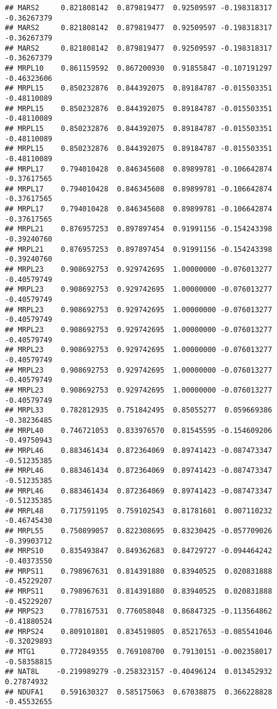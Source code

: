 \documentclass[
]{article}
\begin{document}
\begin{verbatim}
## MARS2     0.821808142  0.879819477  0.92509597 -0.198318317 -0.36267379
## MARS2     0.821808142  0.879819477  0.92509597 -0.198318317 -0.36267379
## MARS2     0.821808142  0.879819477  0.92509597 -0.198318317 -0.36267379
## MRPL10    0.861159592  0.867200930  0.91855847 -0.107191297 -0.46323606
## MRPL15    0.850232876  0.844392075  0.89184787 -0.015503351 -0.48110089
## MRPL15    0.850232876  0.844392075  0.89184787 -0.015503351 -0.48110089
## MRPL15    0.850232876  0.844392075  0.89184787 -0.015503351 -0.48110089
## MRPL15    0.850232876  0.844392075  0.89184787 -0.015503351 -0.48110089
## MRPL17    0.794010428  0.846345608  0.89899781 -0.106642874 -0.37617565
## MRPL17    0.794010428  0.846345608  0.89899781 -0.106642874 -0.37617565
## MRPL17    0.794010428  0.846345608  0.89899781 -0.106642874 -0.37617565
## MRPL21    0.876957253  0.897897454  0.91991156 -0.154243398 -0.39240760
## MRPL21    0.876957253  0.897897454  0.91991156 -0.154243398 -0.39240760
## MRPL23    0.908692753  0.929742695  1.00000000 -0.076013277 -0.40579749
## MRPL23    0.908692753  0.929742695  1.00000000 -0.076013277 -0.40579749
## MRPL23    0.908692753  0.929742695  1.00000000 -0.076013277 -0.40579749
## MRPL23    0.908692753  0.929742695  1.00000000 -0.076013277 -0.40579749
## MRPL23    0.908692753  0.929742695  1.00000000 -0.076013277 -0.40579749
## MRPL23    0.908692753  0.929742695  1.00000000 -0.076013277 -0.40579749
## MRPL23    0.908692753  0.929742695  1.00000000 -0.076013277 -0.40579749
## MRPL33    0.782812935  0.751842495  0.85055277  0.059669386 -0.38236485
## MRPL40    0.746721053  0.833976570  0.81545595 -0.154609206 -0.49750943
## MRPL46    0.883461434  0.872364069  0.89741423 -0.087473347 -0.51235385
## MRPL46    0.883461434  0.872364069  0.89741423 -0.087473347 -0.51235385
## MRPL46    0.883461434  0.872364069  0.89741423 -0.087473347 -0.51235385
## MRPL48    0.717591195  0.759102543  0.81781601  0.007110232 -0.46745430
## MRPL55    0.750899057  0.822308695  0.83230425 -0.057709026 -0.39903712
## MRPS10    0.835493847  0.849362683  0.84729727 -0.094464242 -0.40373550
## MRPS11    0.798967631  0.814391880  0.83940525  0.020831888 -0.45229207
## MRPS11    0.798967631  0.814391880  0.83940525  0.020831888 -0.45229207
## MRPS23    0.778167531  0.776058048  0.86847325 -0.113564862 -0.41880524
## MRPS24    0.809101801  0.834519805  0.85217653 -0.085541046 -0.32029893
## MTG1      0.772849355  0.769108700  0.79130151 -0.002358017 -0.58358815
## NAT8L    -0.219989279 -0.258323157 -0.40496124  0.013452932  0.27874932
## NDUFA1    0.591630327  0.585175063  0.67038875  0.366228828 -0.45532655

\end{verbatim}
\end{document}
